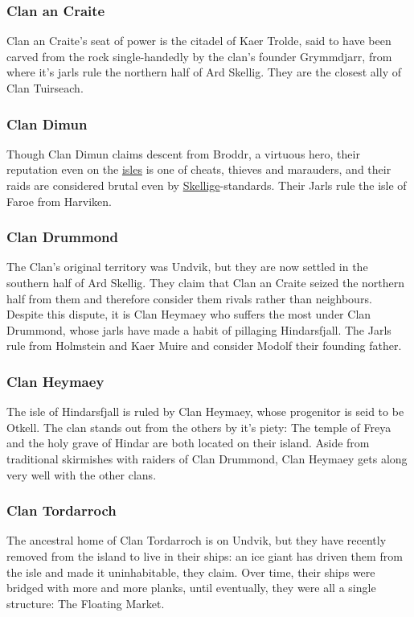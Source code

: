 \documentclass[parskip=full,11pt,%
footheight=38pt]{scrreport}
\begin{document}
\subsubsection{Clan an Craite}
Clan an Craite's seat of power is the citadel of Kaer Trolde, said to have been carved from the rock single-handedly by the clan's founder Grymmdjarr,
from where it's jarls rule the northern half of Ard Skellig. They are the closest ally of Clan Tuirseach.

\subsubsection{Clan Dimun}
Though Clan Dimun claims descent from Broddr, a virtuous hero, their reputation even on the \hyperref[region:skellige]{isles} is one of cheats, thieves
and marauders, and their raids are considered brutal even by \hyperref[region:skellige]{Skellige}-standards. Their Jarls rule the isle of Faroe from Harviken.

\subsubsection{Clan Drummond}
The Clan's original territory was Undvik, but they are now settled in the southern half of Ard Skellig. They claim that Clan an Craite seized the northern half
from them and therefore consider them rivals rather than neighbours. Despite this dispute, it is Clan Heymaey who suffers the most under Clan Drummond, whose
jarls have made a habit of pillaging Hindarsfjall. The Jarls rule from Holmstein and Kaer Muire and consider Modolf their founding father.

\subsubsection{Clan Heymaey}
The isle of Hindarsfjall is ruled by Clan Heymaey, whose progenitor is seid to be Otkell. The clan stands out from the others by it's piety: The temple of Freya
and the holy grave of Hindar are both located on their island. Aside from traditional skirmishes with raiders of Clan Drummond, Clan Heymaey gets along
very well with the other clans.

\subsubsection{Clan Tordarroch}
The ancestral home of Clan Tordarroch is on Undvik, but they have recently removed from the island to live in their ships: an ice giant has driven them from
the isle and made it uninhabitable, they claim. Over time, their ships were bridged with more and more planks, until eventually, they were all a single structure:
The Floating Market.
\end{document}
